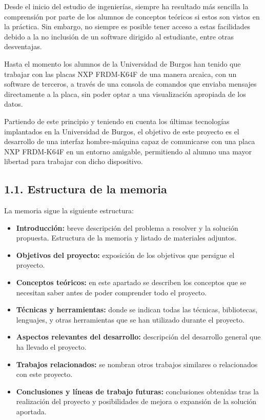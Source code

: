 
Desde el inicio del estudio de ingenierías, siempre ha resultado más sencilla la comprensión por parte de los alumnos de conceptos teóricos si estos son vistos en la práctica. Sin embargo, no siempre es posible tener acceso a estas facilidades debido a la no inclusión de un software dirigido al estudiante, entre otras desventajas.

Hasta el momento los alumnos de la Universidad de Burgos han tenido que trabajar con las placas NXP FRDM-K64F de una manera arcaica, con un software de terceros, a través de una consola de comandos que enviaba mensajes directamente a la placa, sin poder optar a una visualización apropiada de los datos.

Partiendo de este principio y teniendo en cuenta los últimas tecnologías implantados en la Universidad de Burgos, el objetivo de este proyecto es el desarrollo de una interfaz hombre-máquina capaz de comunicarse con una placa NXP FRDM-K64F en un entorno amigable, permitiendo al alumno una mayor libertad para trabajar con dicho dispositivo.

\subsection{1.1. Estructura de la memoria}

La memoria sigue la siguiente estructura:
\begin{itemize}
	\item \textbf{Introducción:} breve descripción del problema a resolver y la solución propuesta. Estructura de la memoria y listado de materiales adjuntos.
	\item \textbf{Objetivos del proyecto:} exposición de los objetivos que persigue el proyecto.
	\item \textbf{Conceptos teóricos:} en este apartado se describen los conceptos que se necesitan saber antes de poder comprender todo el proyecto.
	\item \textbf{Técnicas y herramientas:} donde se indican todas las técnicas, bibliotecas, lenguajes, y otras herramientas que se han utilizado durante el proyecto.
	\item \textbf{Aspectos relevantes del desarrollo:} descripción del desarrollo general que ha llevado el proyecto.
	\item \textbf{Trabajos relacionados:} se nombran otros trabajos similares o relacionados con este proyecto. 
	\item \textbf{Conclusiones y líneas de trabajo futuras:} conclusiones obtenidas tras la realización del proyecto y posibilidades de mejora o expansión de la solución aportada.
\end{itemize}

